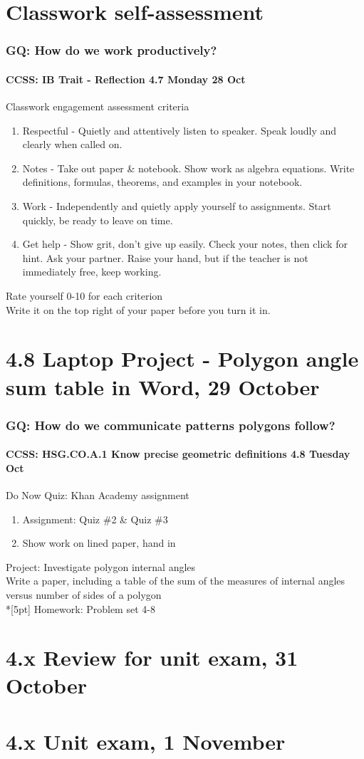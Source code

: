\documentclass{beamer}
\begin{document}
\section{Classwork self-assessment}
\frame
{
\frametitle{GQ: How do we work productively?}
\framesubtitle{CCSS: IB Trait - Reflection \hfill \alert{4.7 Monday 28 Oct}}
\begin{block}{Classwork engagement assessment criteria}
  \begin{enumerate}
    \item Respectful - Quietly and attentively listen to speaker. Speak loudly and clearly when called on.
    \item Notes - Take out paper \& notebook. Show work as algebra equations. Write definitions, formulas, theorems, and examples in your notebook.
    \item Work - Independently and quietly apply yourself to assignments. Start quickly, be ready to leave on time.
    \item Get help - Show grit, don't give up easily. Check your notes, then click for hint. Ask your partner. Raise your hand, but if the teacher is not immediately free, keep working.
  \end{enumerate}
  \end{block}
  Rate yourself 0-10 for each criterion\\
  Write it on the top right of your paper before you turn it in.
  }

\section{4.8 Laptop Project - Polygon angle sum table in Word, 29 October}
\frame
{
\frametitle{GQ: How do we communicate patterns polygons follow?}
\framesubtitle{CCSS: HSG.CO.A.1 Know precise geometric definitions \hfill \alert{4.8 Tuesday Oct}}

\begin{block}{Do Now Quiz: Khan Academy assignment}
\begin{enumerate}
  \item Assignment: Quiz \#2 \& Quiz \#3
  \item Show work on lined paper, hand in
\end{enumerate}
\end{block}
Project: Investigate polygon internal angles\\
Write a paper, including a table of the sum of the measures of internal angles versus number of sides of a polygon \\*[5pt]
Homework: Problem set 4-8
}

\section{4.x Review for unit exam, 31 October}

\section{4.x Unit exam, 1 November}
\end{document}
